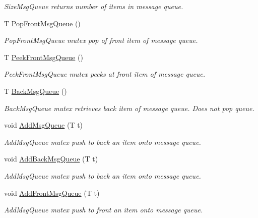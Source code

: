 \begin{DoxyCompactItemize}
\begin{DoxyCompactList}\small\item\em Size\+Msg\+Queue returns number of items in message queue. \end{DoxyCompactList}\item 
T \hyperlink{class_r_c_s_1_1_c_message_queue_afbde6b0fa4044557ba5f990c69d52ff7}{Pop\+Front\+Msg\+Queue} ()
\begin{DoxyCompactList}\small\item\em Pop\+Front\+Msg\+Queue mutex pop of front item of message queue. \end{DoxyCompactList}\item 
T \hyperlink{class_r_c_s_1_1_c_message_queue_a1c01196dadf55e07e7507a552b94a452}{Peek\+Front\+Msg\+Queue} ()
\begin{DoxyCompactList}\small\item\em Peek\+Front\+Msg\+Queue mutex peeks at front item of message queue. \end{DoxyCompactList}\item 
T \hyperlink{class_r_c_s_1_1_c_message_queue_a5d669a3cecd23be9113567421f2b06a1}{Back\+Msg\+Queue} ()
\begin{DoxyCompactList}\small\item\em Back\+Msg\+Queue mutex retrieves back item of message queue. Does not pop queue. \end{DoxyCompactList}\item 
void \hyperlink{class_r_c_s_1_1_c_message_queue_a1f23fdbd7b3c7c3861abea8fb0899288}{Add\+Msg\+Queue} (T t)
\begin{DoxyCompactList}\small\item\em Add\+Msg\+Queue mutex push to back an item onto message queue. \end{DoxyCompactList}\item 
void \hyperlink{class_r_c_s_1_1_c_message_queue_a975b0dc0f762f129fb6bd9297cbb3a3d}{Add\+Back\+Msg\+Queue} (T t)
\begin{DoxyCompactList}\small\item\em Add\+Msg\+Queue mutex push to back an item onto message queue. \end{DoxyCompactList}\item 
void \hyperlink{class_r_c_s_1_1_c_message_queue_a4da04a657574f94d654898fd0bfc5983}{Add\+Front\+Msg\+Queue} (T t)
\begin{DoxyCompactList}\small\item\em Add\+Msg\+Queue mutex push to front an item onto message queue. \end{DoxyCompactList}\item 

\end{DoxyCompactItemize}
